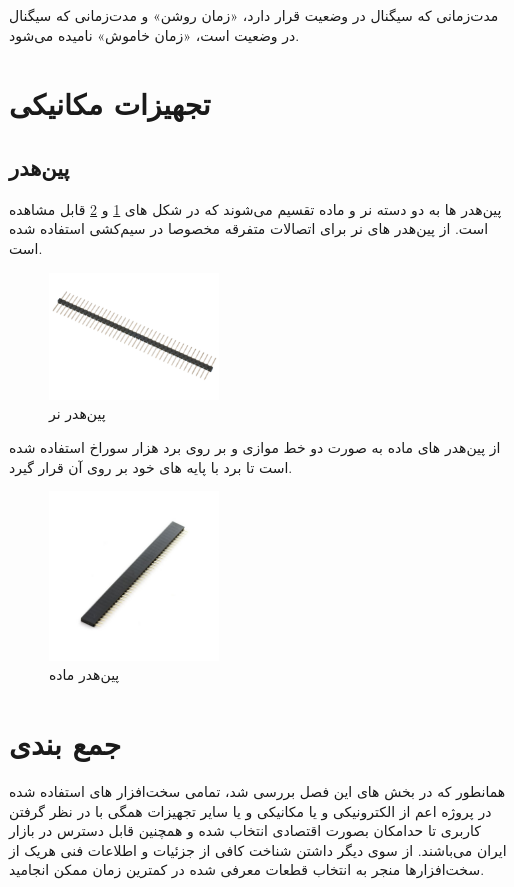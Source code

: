 مدت‌زمانی که سیگنال در وضعیت  قرار دارد، «زمان روشن» و مدت‌زمانی که سیگنال در وضعیت  است، «زمان خاموش»  نامیده می‌شود.

\section{تجهیزات مکانیکی}

\subsection{پین‌هدر}
پین‌هدر ها به دو دسته نر و ماده تقسیم می‌شوند که در شکل های
\ref{پین‌هدر نر}
و
\ref{پین‌هدر ماده}
قابل مشاهده است. از پین‌هدر های نر برای اتصالات متفرقه مخصوصا در سیم‌کشی استفاده شده است.
\begin{figure}[H]
	\centering
	\includegraphics[width=0.4\textwidth]{./images/Chapter4/PinHeaderMale}
	\caption[پین‌هدر نر]{پین‌هدر نر \cite{PinHeaderMale}}
	\label{پین‌هدر نر}
\end{figure}
از پین‌هدر های ماده به صورت دو خط موازی و بر روی برد هزار سوراخ استفاده شده است تا برد
با پایه های خود بر روی آن قرار گیرد.
\begin{figure}[H]
	\centering
	\includegraphics[width=0.4\textwidth]{./images/Chapter4/PinHeaderFemale}
	\caption[پین‌هدر ماده]{پین‌هدر ماده\cite{PinHeaderFemale}}
	\label{پین‌هدر ماده}
\end{figure}


\section{جمع بندی}
همانطور که در بخش های این فصل بررسی شد، تمامی سخت‌افزار های استفاده شده در پروژه اعم از الکترونیکی و یا مکانیکی و یا سایر تجهیزات همگی با در نظر گرفتن کاربری تا حدامکان بصورت اقتصادی انتخاب شده و همچنین قابل دسترس در بازار ایران می‌باشند.
از سوی دیگر داشتن شناخت کافی از جزئیات و اطلاعات فنی هریک از سخت‌افزار‌ها منجر به انتخاب  قطعات معرفی شده در کمترین زمان ممکن انجامید.
